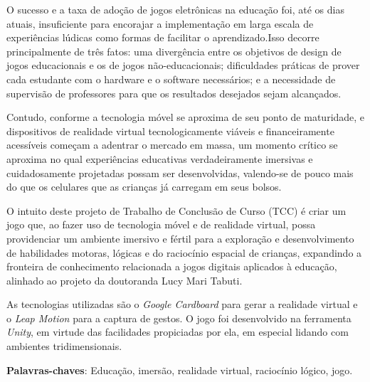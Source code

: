 \begin{resumo}
\begin{comment}
O resumo deve ser redigido, preferencialmente, na terceira pessoa do singular com verbo na voz ativa, em parágrafo único, e conter no máximo 500 palavras.
\end{comment}

O sucesso e a taxa de adoção de jogos eletrônicas na educação foi, 
até os dias atuais, insuficiente para encorajar a implementação 
em larga escala de experiências lúdicas como formas de facilitar 
o aprendizado.Isso decorre principalmente de três fatos: 
uma divergência entre os objetivos de design de jogos 
educacionais e os de jogos não-educacionais; dificuldades 
práticas de prover cada estudante com o hardware e o software 
necessários; e a necessidade de supervisão de professores 
para que os resultados desejados sejam alcançados.

Contudo, conforme a tecnologia móvel se aproxima de seu ponto 
de maturidade, e dispositivos de realidade virtual tecnologicamente 
viáveis e financeiramente acessíveis começam a adentrar o 
mercado em massa, um momento crítico se aproxima no qual 
experiências educativas verdadeiramente imersivas e cuidadosamente 
projetadas possam ser desenvolvidas, valendo-se de pouco mais 
do que os celulares que as crianças já carregam em seus bolsos.

O intuito deste projeto de Trabalho de Conclusão de Curso 
(TCC) é criar um jogo que, ao fazer uso de tecnologia móvel 
e de realidade virtual, possa providenciar um ambiente 
imersivo e fértil para a exploração e desenvolvimento de 
habilidades motoras, lógicas e do raciocínio espacial de 
crianças, expandindo a fronteira de conhecimento relacionada 
a jogos digitais aplicados à educação, alinhado ao projeto 
da doutoranda Lucy Mari Tabuti.

As tecnologias utilizadas são o \textit{Google Cardboard} para 
gerar a realidade virtual e o\textit{ Leap Motion} para a captura 
de gestos. O jogo foi desenvolvido na ferramenta \textit{Unity}, 
em virtude das facilidades propiciadas por ela, em 
especial lidando com ambientes tridimensionais.

 \vspace{\onelineskip}

 \noindent
 \textbf{Palavras-chaves}: Educação, imersão, realidade virtual, raciocínio lógico, jogo.
\end{resumo}
 
